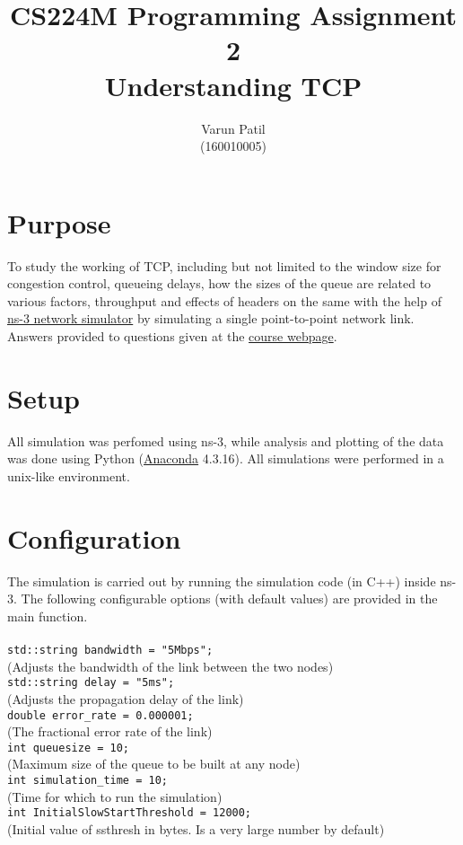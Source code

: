 \documentclass[a4paper]{article}
\title{CS224M Programming Assignment 2 \\ Understanding TCP}
\author{Varun Patil\\(160010005)}
\begin{document}
  \maketitle 
  \vspace{-8mm}

  \section*{Purpose}
  To study the working of TCP, including but not limited to the window size for congestion control, queueing delays, how the sizes of the queue are related to various factors, throughput and effects of headers on the same with the help of \href{https://www.nsnam.org/}{ns-3 network simulator} by simulating a single point-to-point network link. Answers provided to questions given at the \href{https://www.cse.iitb.ac.in/~cs224m/tcpsimpa/index.html}{course webpage}.
  
  \section*{Setup}
  All simulation was perfomed using ns-3, while analysis and plotting of the data was done using Python (\href{https://www.continuum.io/Anaconda-Overview}{Anaconda} 4.3.16). All simulations were performed in a unix-like environment.
  
  \section*{Configuration}
  The simulation is carried out by running the simulation code (in C++) inside ns-3. The following configurable options (with default values) are provided in the main function.\\~\\
  \texttt{std::string bandwidth = "5Mbps";} \\
  \indent (Adjusts the bandwidth of the link between the two nodes)\\
  \texttt{std::string delay = "5ms";}\\
  \indent (Adjusts the propagation delay of the link)\\
  \texttt{double error\_rate = 0.000001;}\\
  \indent (The fractional error rate of the link)\\
  \texttt{int queuesize = 10;}\\
  \indent (Maximum size of the queue to be built at any node)\\
  \texttt{int simulation\_time = 10;}\\
  \indent (Time for which to run the simulation)\\
  \texttt{int InitialSlowStartThreshold = 12000;}\\
  \indent (Initial value of ssthresh in bytes. Is a very large number by default)
  
\end{document}
